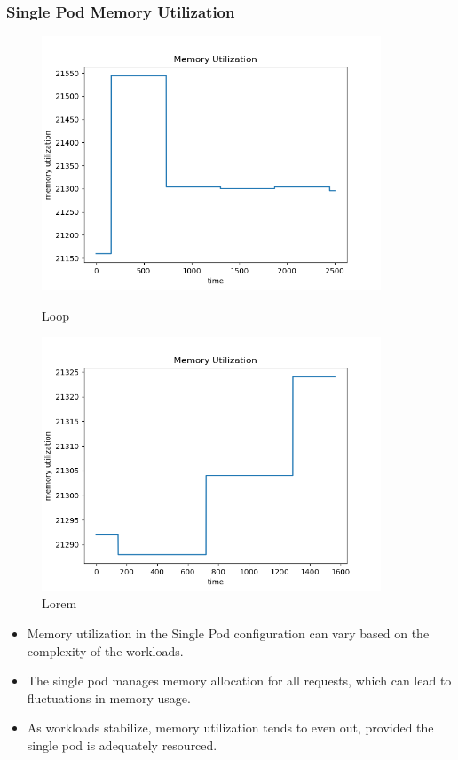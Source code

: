 \subsubsection{Single Pod Memory Utilization}
\begin{figure}[h]
    \begin{minipage}[t]{0.5\textwidth}
        \centering
        \includegraphics[width=0.9\textwidth]{../sample_results/loop/single-pod/mem-utilization-single-pod.png}
        \caption{Loop}
    \end{minipage}
    \hfill
    \begin{minipage}[t]{0.5\textwidth}
        \centering
        \includegraphics[width=0.9\textwidth]{../sample_results/lorem/single-pod/mem-utilization-single-pod.png}
        \caption{Lorem}
    \end{minipage}
\end{figure}

\begin{itemize}
    \item Memory utilization in the Single Pod configuration can vary based on the complexity of the workloads.
    \item The single pod manages memory allocation for all requests, which can lead to fluctuations in memory usage.
    \item As workloads stabilize, memory utilization tends to even out, provided the single pod is adequately resourced.
\end{itemize}

